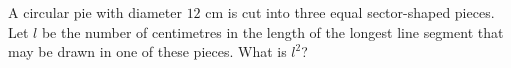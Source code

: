 A circular pie with diameter $12$ cm is cut into three equal sector-shaped pieces. Let $l$ be the number of centimetres in the length of the longest line segment that may be drawn in one of these pieces. What is $l^2$?
